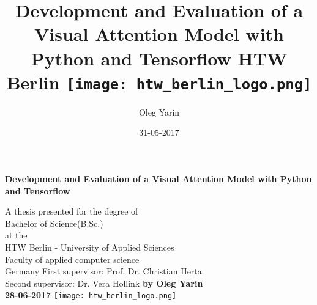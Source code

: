 
\title{
	{Development and Evaluation of a Visual Attention Model with Python and Tensorflow}
	{\large HTW Berlin}
	{\texttt{[image: htw\_berlin\_logo.png]}}
}
\author{Oleg Yarin}
\date{31-05-2017}


\begin{titlepage}
	\begin{center}
		\vspace*{1cm}

		\LARGE
		\textbf{Development and Evaluation of a Visual Attention Model with Python and Tensorflow}


		\vspace{0.2cm}
		\Large


		\vfill

		A thesis presented for the degree of\\
		Bachelor of Science(B.Sc.) \\
		at the \\
		HTW Berlin - University of Applied Sciences \\
		Faculty of applied computer science\\
		Germany
		\vfill
		\normalsize
		First supervisor: Prof. Dr. Christian Herta \\
		Second supervisor: Dr. Vera Hollink
		\vfill
		\textbf{by Oleg Yarin} \\
		\textbf{28-06-2017}
		\vfill
		\texttt{[image: htw\_berlin\_logo.png]}\\
		\large


	\end{center}
\end{titlepage}
